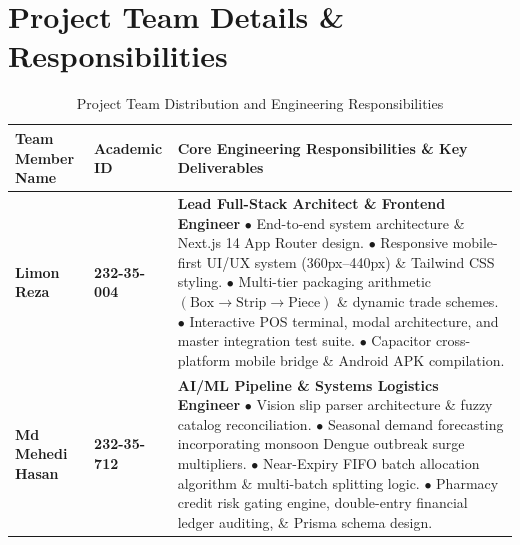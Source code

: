 \documentclass[10pt,a4paper]{article}
\begin{document}
\section{Project Team Details \& Responsibilities}

\begin{table}[h!]
\centering
\small
\begin{tabularx}{\textwidth}{p{3.5cm}p{3.0cm}X}
\toprule
\textbf{Team Member Name} & \textbf{Academic ID} & \textbf{Core Engineering Responsibilities \& Key Deliverables} \\
\midrule
\textbf{Limon Reza} & \textbf{232-35-004} & \textbf{Lead Full-Stack Architect \& Frontend Engineer}\newline
$\bullet$ End-to-end system architecture \& Next.js 14 App Router design.\newline
$\bullet$ Responsive mobile-first UI/UX system (360px--440px) \& Tailwind CSS styling.\newline
$\bullet$ Multi-tier packaging arithmetic $(\text{Box} \to \text{Strip} \to \text{Piece})$ \& dynamic trade schemes.\newline
$\bullet$ Interactive POS terminal, modal architecture, and master integration test suite.\newline
$\bullet$ Capacitor cross-platform mobile bridge \& Android APK compilation. \\
\addlinespace
\textbf{Md Mehedi Hasan} & \textbf{232-35-712} & \textbf{AI/ML Pipeline \& Systems Logistics Engineer}\newline
$\bullet$ Vision slip parser architecture \& fuzzy catalog reconciliation.\newline
$\bullet$ Seasonal demand forecasting incorporating monsoon Dengue outbreak surge multipliers.\newline
$\bullet$ Near-Expiry FIFO batch allocation algorithm \& multi-batch splitting logic.\newline
$\bullet$ Pharmacy credit risk gating engine, double-entry financial ledger auditing, \& Prisma schema design. \\
\bottomrule
\end{tabularx}
\caption{Project Team Distribution and Engineering Responsibilities}
\end{table}
\end{document}
